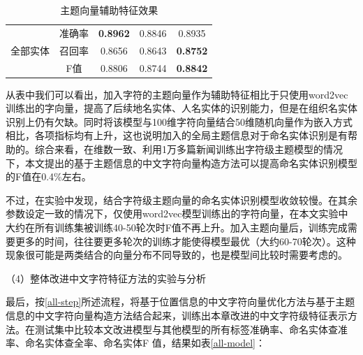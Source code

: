 \documentclass[winfonts,master,oneside,nobackinfo]{njuthesis}
\begin{document}
\begin{table}[h]
\begin{tabular}{|c|c|c|c|c|}
\multirow{3}{*}{全部实体}  & 准确率 & \textbf{0.8962}  & 0.8846                                                    & 0.8935                                                    \\ \cline{2-5} 
                       & 召回率 & 0.8656  & 0.8643                                                    & \textbf{0.8752}                                                    \\ \cline{2-5} 
                       & F值  & 0.8806  & 0.8744                                                    & \textbf{0.8842}                                                    \\ \hline
\end{tabular}
\caption{主题向量辅助特征效果}
\label{exp-topic}
\end{table}

从表中我们可以看出，加入字符的主题向量作为辅助特征相比于只使用word2vec训练出的字向量，提高了后续地名实体、人名实体的识别能力，但是在组织名实体识别上仍有欠缺。同时将该模型与100维字符向量结合50维随机向量作为嵌入方式相比，各项指标均有上升，这也说明加入的全局主题信息对于命名实体识别是有帮助的。综合来看，在维数一致、利用1万多篇新闻训练出字符级主题模型的情况下，本文提出的基于主题信息的中文字符向量构造方法可以提高命名实体识别模型的F值在0.4\%左右。

不过，在实验中发现，结合字符级主题向量的命名实体识别模型收敛较慢。在其余参数设定一致的情况下，仅使用word2vec模型训练出的字符向量，在本文实验中大约在所有训练集被训练40-50轮次时F值不再上升。加入主题向量后，训练完成需要更多的时间，往往要更多轮次的训练才能使得模型最优（大约60-70轮次）。这种现象很可能是两类结合的向量分布不同导致的，也是模型间比较时需要考虑的。

（4）整体改进中文字符特征方法的实验与分析

最后，按\ref{all-step}所述流程，将基于位置信息的中文字符向量优化方法与基于主题信息的中文字符向量构造方法结合起来，训练出本章改进的中文字符级特征表示方法。在测试集中比较本文改进模型与其他模型的所有标签准确率、命名实体查准率、命名实体查全率、命名实体F
值，结果如表\ref{all-model}：
\end{document}

